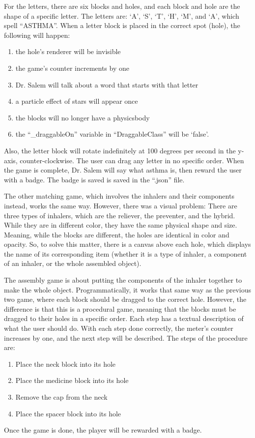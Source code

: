For the letters, there are six blocks and holes, and each block and hole are the shape of a specific letter. The letters are: ‘A’, ‘S’, ‘T’, ‘H’, ‘M’, and ‘A’, which spell “ASTHMA”. When a letter block is placed in the correct spot (hole), the following will happen: 
\begin{enumerate}
\item{the hole's renderer will be invisible}
\item{the game’s counter increments by one}
\item{Dr. Salem will talk about a word that starts with that letter}
\item{a particle effect of stars will appear once}
\item{the blocks will no longer have a physicsbody}
\item{the “{\codefont \_draggableOn}” variable in “{\codefont DraggableClass}” will be ‘{\codefont false}’.}
\end{enumerate}
Also, the letter block will rotate indefinitely at 100 degrees per second in the y-axis, counter-clockwise. The user can drag any letter in no specific order. When the game is complete, Dr. Salem will say what asthma is, then reward the user with a badge. The badge is saved is saved in the “.json” file.

The other matching game, which involves the inhalers and their components instead, works the same way. However, there was a visual problem: There are three types of inhalers, which are the reliever, the preventer, and the hybrid. While they are in different color, they have the same physical shape and size. Meaning, while the blocks are different, the holes are identical in color and opacity. So, to solve this matter, there is a canvas above each hole, which displays the name of its corresponding item (whether it is a type of inhaler, a component of an inhaler, or the whole assembled object).

The assembly game is about putting the components of the inhaler together to make the whole object. Programmatically, it works that same way as the previous two game, where each block should be dragged to the correct hole. However, the difference is that this is a procedural game, meaning that the blocks must be dragged to their holes in a specific order. Each step has a textual description of what the user should do. With each step done correctly, the meter’s counter increases by one, and the next step will be described. The steps of the procedure are:
\begin{enumerate}
\item{Place the neck block into its hole}

\item{Place the medicine block into its hole}

\item{Remove the cap from the neck}

\item{Place the spacer block into its hole}
\end{enumerate}
Once the game is done, the player will be rewarded with a badge.
